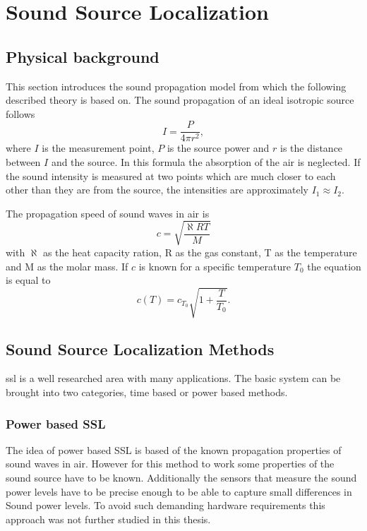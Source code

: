 \graphicspath{ {images/3_source_localization/} }
\chapter{Sound Source Localization}
\section{Physical background}
This section introduces the sound propagation model from \cite{physik_skript} which the following described theory is based on.
The sound propagation of an ideal isotropic source follows
\begin{equation}
	I = \frac{P}{4\pi r^2},
\end{equation}
where $I$ is the measurement point, $P$ is the source power and $r$ is the distance
between $I$ and the source.
In this formula the absorption of the air is neglected.
If the sound intensity is measured at two points which are much closer
to each other than they are from the source, the intensities are approximately
$I_1 \approx I_2$.

The propagation speed of sound waves in air is
\begin{equation}
	c = \sqrt{\frac{\aleph R T}{M}}
\end{equation}
with $\aleph$ as the heat capacity ration, R as the gas constant, T as the temperature
and M as the molar mass.
If $c$ is known for a specific temperature $T_0$ the equation is equal to
\begin{equation}
	c(T) = c_{T_0} \sqrt{1 + \frac{T}{T_0}}.
\end{equation}


\section{Sound Source Localization Methods}
\acrfull{ssl} is a well researched area with many applications.
The basic system can be brought into two categories, time based or power based methods.
\subsection{Power based SSL}
The idea of power based SSL is based of the known propagation properties of sound waves in air.
However for this method to work some properties of the sound source have to be known.
Additionally the sensors that measure the sound power levels have to be precise
enough to be able to capture small differences in Sound power levels.
To avoid such demanding hardware requirements this approach was not further
studied in this thesis.

